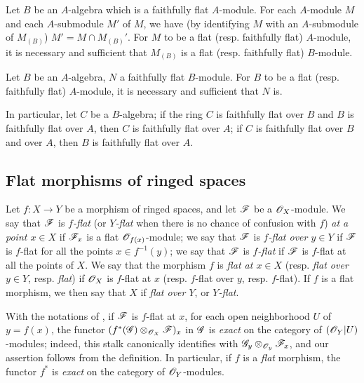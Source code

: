 \begin{env}[6.6.3]
\label{0.6.6.3}
Let $B$ be an $A$-algebra which is a faithfully flat $A$-module. For each $A$-module $M$ and
each $A$-submodule $M'$ of $M$, we have (by identifying $M$ with an $A$-submodule of
$M_{(B)}$) $M'=M\cap M_{(B)}'$. For $M$ to be a flat (resp. faithfully flat) $A$-module, it
is necessary and sufficient that $M_{(B)}$ is a flat (resp. faithfully flat) $B$-module.
\end{env}

\begin{env}[6.6.4]
\label{0.6.6.4}
Let $B$ be an $A$-algebra, $N$ a faithfully flat $B$-module. For $B$ to be a flat
(resp. faithfully flat) $A$-module, it is necessary and sufficient that $N$ is.

In particular, let $C$ be a $B$-algebra; if the ring $C$ is faithfully flat over $B$ and $B$
is faithfully flat over $A$, then $C$ is faithfully flat over $A$; if $C$ is faithfully flat
over $B$ and over $A$, then $B$ is faithfully flat over $A$.
\end{env}

\subsection{Flat morphisms of ringed spaces}
\label{subsection-flat-morphisms-of-ringed-spaces}

\begin{env}[6.7.1]
\label{0.6.7.1}
Let $f:X\to Y$ be a morphism of ringed spaces, and let $\mathscr{F}$ be a $\mathscr{O}_X$-module. We say
that $\mathscr{F}$ is {\em $f$-flat} (or {\em $Y$-flat} when there is no chance of confusion
with $f$) {\em at a point $x\in X$} if $\mathscr{F}_x$ is a flat $\mathscr{O}_{f(x)}$-module; we say that
$\mathscr{F}$ is {\em $f$-flat over $y\in Y$} if $\mathscr{F}$ is $f$-flat for all the points
$x\in f^{-1}(y)$; we say that $\mathscr{F}$ is {\em $f$-flat} if $\mathscr{F}$ is $f$-flat at all the
points of $X$. We say that the morphism $f$ is {\em flat at $x\in X$} (resp. {\em flat over
$y\in Y$}, resp. {\em flat}) if $\mathscr{O}_X$ is $f$-flat at $x$ (resp. $f$-flat over $y$, resp.
$f$-flat). If $f$ is a flat morphism, we then say that $X$ if {\em flat over $Y$}, or
{\em $Y$-flat}.
\end{env}

\begin{env}[6.7.2]
\label{0.6.7.2}
With the notations of , if $\mathscr{F}$ is $f$-flat at $x$, for each open
neighborhood $U$ of $y=f(x)$, the functor $(f^*(\mathscr{G})\otimes_{\mathscr{O}_X}\mathscr{F})_x$ in $\mathscr{G}$
is {\em exact} on the category of $(\mathscr{O}_Y|U)$-modules; indeed, this stalk canonically
identifies with $\mathscr{G}_y\otimes_{\mathscr{O}_y}\mathscr{F}_x$, and our assertion follows from the
definition. In particular, if $f$ is a {\em flat} morphism, the functor $f^*$ is
{\em exact} on the category of $\mathscr{O}_Y$-modules.
\end{env}

